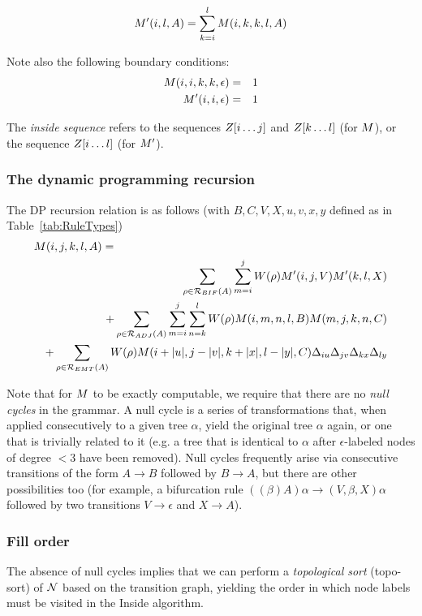 \documentclass[10pt]{article}
\newcommand{\tabnum}[1]{\ref{tab:#1}}
\newcommand{\tabref}[1]{Table~\tabnum{#1}}
\begin{document}
\[
M'(i,l,A) = \sum_{k=i}^l M(i,k,k,l,A)
\]

Note also the following boundary conditions:
\begin{eqnarray*}
M(i,i,k,k,\epsilon) & = & 1 \\
M'(i,i,\epsilon) & = & 1
\end{eqnarray*}

The {\em inside sequence} refers to the sequences $Z[i \ldots j]$ and $Z[k \ldots l]$ (for $M$),
or the sequence $Z[i \ldots l]$ (for $M'$).

\subsubsection{The dynamic programming recursion}

The DP recursion relation is as follows (with $B,C,V,X,u,v,x,y$ defined as in \tabref{RuleTypes})
\begin{eqnarray*}
\lefteqn{\m(i,j,k,l,A) =} \\
& &
\sum_{\rho \in \rulesubset{BIF}{A}} \sum_{m=i}^j W(\rho) \mtip(i,j,V) \mtip(k,l,X) \\
& & +
\sum_{\rho \in \rulesubset{ADJ}{A}} \sum_{m=i}^j \sum_{n=k}^l W(\rho) \m(i,m,n,l,B) \m(m,j,k,n,C) \\
& & +
\sum_{\rho \in \rulesubset{EMT}{A}} W(\rho) \m(i+|u|,j-|v|,k+|x|,l-|y|,C) \iumatch \jvmatch \kxmatch \lymatch
\end{eqnarray*}

Note that for $M$ to be exactly computable, we require that there are no {\em null cycles} in the grammar.
A null cycle is a series of transformations that, when applied consecutively to a given tree $\alpha$, yield the original tree $\alpha$ again,
or one that is trivially related to it (e.g. a tree that is identical to $\alpha$ after $\epsilon$-labeled nodes of degree $<3$ have been removed).
Null cycles frequently arise via consecutive transitions of the form $A \to B$ followed by $B \to A$,
but there are other possibilities too (for example, a bifurcation rule $((\beta)A)\alpha \to (V,\beta,X)\alpha$
followed by two transitions $V \to \epsilon$ and $X \to A$).

\subsubsection{Fill order}

The absence of null cycles implies that we can perform a {\em topological sort} (topo-sort) of ${\cal N}$ based on the transition graph,
yielding the order in which node labels must be visited in the Inside algorithm.
\end{document}
